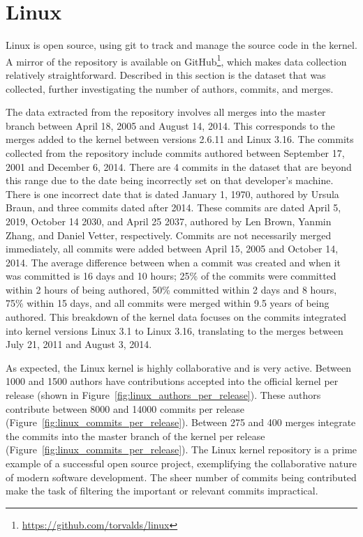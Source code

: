 \section{Linux}\label{sec:linux}

Linux is open source, using git to track and manage the source code in
the kernel. A mirror of the repository is available on
GitHub\footnote{\url{https://github.com/torvalds/linux}}, which makes
data collection relatively straightforward. Described in this section is
the dataset that was collected, further investigating the number of
authors, commits, and merges.

The data extracted from the repository involves all merges into the
master branch between April 18, 2005 and August 14, 2014. This
corresponds to the merges added to the kernel between versions 2.6.11
and Linux 3.16. The commits collected from the repository include
commits authored between September 17, 2001 and December 6, 2014. There
are 4 commits in the dataset that are beyond this range due to the date
being incorrectly set on that developer's machine. There is one
incorrect date that is dated January 1, 1970, authored by Ursula Braun,
and three commits dated after 2014. These commits are dated April 5,
2019, October 14 2030, and April 25 2037, authored by Len Brown, Yanmin
Zhang, and Daniel Vetter, respectively. Commits are not necessarily
merged immediately, all commits were added between April 15, 2005 and
October 14, 2014. The average difference between when a commit was
created and when it was committed is 16 days and 10 hours; 25\% of the
commits were committed within 2 hours of being authored, 50\% committed
within 2 days and 8 hours, 75\% within 15 days, and all commits were
merged within 9.5 years of being authored. This breakdown of the kernel
data focuses on the commits integrated into kernel versions Linux 3.1 to
Linux 3.16, translating to the merges between July 21, 2011 and August
3, 2014.

As expected, the Linux kernel is highly collaborative and is very
active. Between 1000 and 1500 authors have contributions accepted into
the official kernel per release (shown in
Figure~\ref{fig:linux_authors_per_release}). These authors contribute
between 8000 and 14000 commits per release
(Figure~\ref{fig:linux_commits_per_release}). Between 275 and 400 merges
integrate the commits into the master branch of the kernel per release
(Figure~\ref{fig:linux_commits_per_release}). The Linux kernel
repository is a prime example of a successful open source project,
exemplifying the collaborative nature of modern software development.
The sheer number of commits being contributed make the task of filtering
the important or relevant commits impractical.

